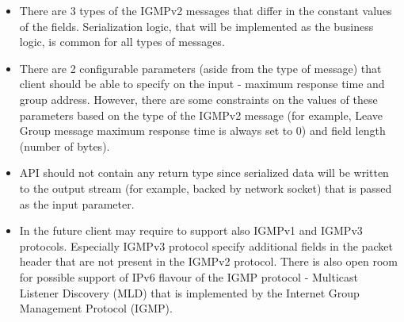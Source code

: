 \begin{itemize}
    \item There are 3 types of the IGMPv2 messages that differ in the constant values of the fields.
    Serialization logic, that will be implemented as the business logic, is common for all types of messages.
    \item There are 2 configurable parameters (aside from the type of message) that client should be able to specify
    on the input - maximum response time and group address.
    However, there are some constraints on the values of these parameters based on the type
    of the IGMPv2 message (for example, Leave Group message maximum response time is always set to 0)
    and field length (number of bytes).
    \item API should not contain any return type since serialized data will be written to the output stream
    (for example, backed by network socket) that is passed as the input parameter.
    \item In the future client may require to support also IGMPv1 and IGMPv3 protocols.
    Especially IGMPv3 protocol specify additional fields in the packet header that are not present
    in the IGMPv2 protocol.
    There is also open room for possible support of IPv6 flavour of the IGMP protocol
    - Multicast Listener Discovery (MLD) that is implemented by the Internet Group Management Protocol (IGMP).
\end{itemize}
